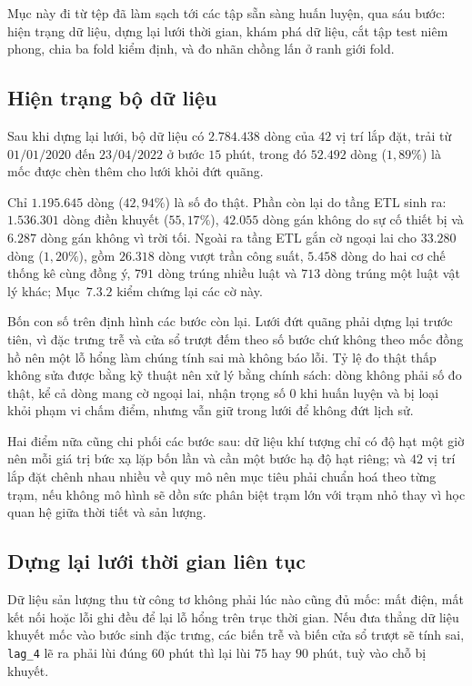 \documentclass[12pt, a4paper]{report}
\begin{document}
Mục này đi từ tệp đã làm sạch tới các tập sẵn sàng huấn luyện, qua sáu bước: hiện trạng dữ
liệu, dựng lại lưới thời gian, khám phá dữ liệu, cắt tập test niêm phong, chia ba fold kiểm
định, và đo nhãn chồng lấn ở ranh giới fold.

\FloatBarrier
\subsection{Hiện trạng bộ dữ liệu}

Sau khi dựng lại lưới, bộ dữ liệu có $2.784.438$ dòng của $42$ vị trí lắp đặt, trải từ
$01/01/2020$ đến $23/04/2022$ ở bước $15$ phút, trong đó $52.492$ dòng ($1{,}89\%$) là mốc
được chèn thêm cho lưới khỏi đứt quãng.

Chỉ $1.195.645$ dòng ($42{,}94\%$) là số đo thật. Phần còn lại do tầng ETL sinh ra: $1.536.301$
dòng điền khuyết ($55{,}17\%$), $42.055$ dòng gán không do sự cố thiết bị và $6.287$ dòng gán
không vì trời tối. Ngoài ra tầng ETL gắn cờ ngoại lai cho $33.280$ dòng ($1{,}20\%$), gồm
$26.318$ dòng vượt trần công suất, $5.458$ dòng do hai cơ chế thống kê cùng đồng ý, $791$ dòng
trúng nhiều luật và $713$ dòng trúng một luật vật lý khác; Mục~$7.3.2$ kiểm chứng lại các cờ này.

Bốn con số trên định hình các bước còn lại. Lưới đứt quãng phải dựng lại trước tiên, vì đặc
trưng trễ và cửa sổ trượt đếm theo số bước chứ không theo mốc đồng hồ nên một lỗ hổng làm chúng
tính sai mà không báo lỗi. Tỷ lệ đo thật thấp không sửa được bằng kỹ thuật nên xử lý bằng chính
sách: dòng không phải số đo thật, kể cả dòng mang cờ ngoại lai, nhận trọng số $0$ khi huấn luyện
và bị loại khỏi phạm vi chấm điểm, nhưng vẫn giữ trong lưới để không đứt lịch sử.

Hai điểm nữa cũng chi phối các bước sau: dữ liệu khí tượng chỉ có độ hạt một giờ nên mỗi giá trị
bức xạ lặp bốn lần và cần một bước hạ độ hạt riêng; và $42$ vị trí lắp đặt chênh nhau nhiều về
quy mô nên mục tiêu phải chuẩn hoá theo từng trạm, nếu không mô hình sẽ dồn sức phân biệt trạm
lớn với trạm nhỏ thay vì học quan hệ giữa thời tiết và sản lượng.

\FloatBarrier
\subsection{Dựng lại lưới thời gian liên tục}

Dữ liệu sản lượng thu từ công tơ không phải lúc nào cũng đủ mốc: mất điện, mất kết nối
hoặc lỗi ghi đều để lại lỗ hổng trên trục thời gian. Nếu đưa thẳng dữ liệu khuyết mốc
vào bước sinh đặc trưng, các biến trễ và biến cửa sổ trượt sẽ tính sai, \texttt{lag\_4}
lẽ ra phải lùi đúng $60$ phút thì lại lùi $75$ hay $90$ phút, tuỳ vào chỗ bị khuyết.
\end{document}
